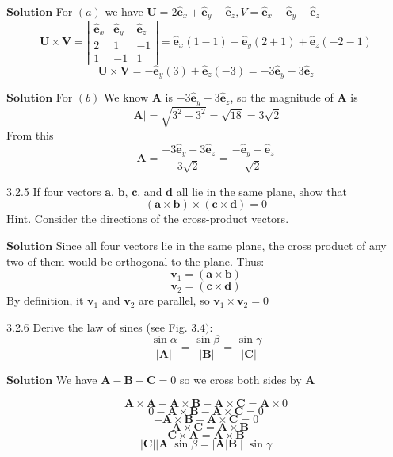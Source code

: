 \documentclass{styles/kaobook}
\begin{document}
$\boxed{\textbf{Solution}}$ For $(a)$ we have $\mathbf{U}=2 \hat{\mathbf{e}}_{x}+\hat{\mathbf{e}}_{y}-\hat{\mathbf{e}}_{z}, V=\hat{\mathbf{e}}_{x}-\hat{\mathbf{e}}_{y}+\hat{\mathbf{e}}_{z}$
$$
\mathbf{U} \times \mathbf{V}=\left|\begin{array}{ccc}
\hat{\mathbf{e}}_{x} & \hat{\mathbf{e}}_{y} & \hat{\mathbf{e}}_{z} \\
2 & 1 & -1 \\
1 & -1 & 1
\end{array}\right|=\hat{\mathbf{e}}_{x}(1-1)-\hat{\mathbf{e}}_{y}(2+1)+\hat{\mathbf{e}}_{z}(-2-1)
$$
$$
\mathbf{U} \times \mathbf{V}=-\hat{\mathbf{e}}_{y}(3)+\hat{\mathbf{e}}_{z}(-3)=-3 \hat{\mathbf{e}}_{y}-3 \hat{\mathbf{e}}_{z}
$$

$\boxed{\textbf{Solution}}$ For $(b)$ We know $\mathbf{A}$ is $-3 \hat{\mathbf{e}}_{y}-3 \hat{\mathbf{e}}_{z}$, so the magnitude of $\mathbf{A}$ is
$$|\mathbf{A}|=\sqrt{3^{2}+3^{2}}=\sqrt{18}=3 \sqrt{2}$$
From this 
$$\mathbf{A}=\frac{-3 \hat{\mathbf{e}}_{y}-3 \hat{\mathbf{e}}_{z}}{3 \sqrt{2}}=\frac{-\hat{\mathbf{e}}_{y}-\hat{\mathbf{e}}_{z}}{\sqrt{2}}$$


\begin{greenbox}{3.2.5}
If four vectors $\mathbf{a}$, $\mathbf{b}$, $\mathbf{c}$, and $\mathbf{d}$ all lie in the same plane, show that
$$
(\mathbf{a} \times \mathbf{b}) \times(\mathbf{c} \times \mathbf{d})=0
$$
Hint. Consider the directions of the cross-product vectors.
\end{greenbox}

$\boxed{\textbf{Solution}}$ Since all four vectors lie in the same plane, the cross product of any two of them would be orthogonal to the plane. Thus:
$$\mathbf{v}_1 = (\mathbf{a} \times \mathbf{b})$$
$$\mathbf{v}_2 = (\mathbf{c} \times \mathbf{d})$$
By definition, it $\mathbf{v}_1$ and $\mathbf{v}_2$ are parallel, so $\mathbf{v}_1 \times \mathbf{v}_2 = 0$





\begin{greenbox}{3.2.6}
Derive the law of sines (see Fig. $3.4):$
$$
\dfrac{\sin \alpha}{|\mathbf{A}|}=\dfrac{\sin \beta}{|\mathbf{B}|}=\dfrac{\sin \gamma}{|\mathbf{C}|}
$$
\end{greenbox}


$\boxed{\textbf{Solution}}$ We have $\mathbf{A}-\mathbf{B}-\mathbf{C}=0$ so we cross both sides by $\mathbf{A}$ 



$$\mathbf{A} \times \mathbf{A}-\mathbf{A} \times \mathbf{B}-\mathbf{A} \times \mathbf{C}=\mathbf{A} \times 0$$
$$ 0-\mathbf{A} \times \mathbf{B}-\mathbf{A} \times \mathbf{C}=0$$
$$-\mathbf{A} \times \mathbf{B}-\mathbf{A} \times \mathbf{C}=0$$
$$-\mathbf{A} \times \mathbf{C}=\mathbf{A} \times \mathbf{B}$$
$$ \mathbf{C} \times \mathbf{A}=\mathbf{A} \times \mathbf{B}$$
$$|\mathbf{C}||\mathbf{A}| \sin \beta=|\mathbf{A}| \mathbf{B} \mid \sin \gamma$$
\end{document}
